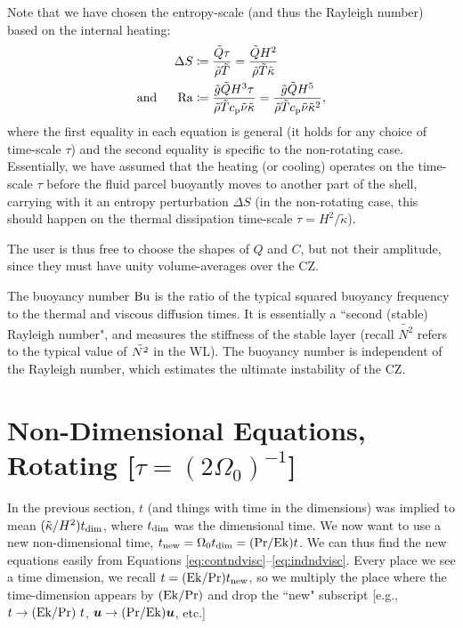 \documentclass[12pt]{article}
\numberwithin{equation}{section}
\begin{document}
Note that we have chosen the entropy-scale (and thus the Rayleigh number) based on the internal heating:
\begin{subequations}
\begin{align}
	\Delta S &\coloneqq \frac{\tilde{Q}\tau}{\tilde{\rho}\tilde{T}} = \frac{\tilde{Q}H^2}{\tilde{\rho}\tilde{T}\tilde{\kappa}}\label{eq:dsnonrot}\\
	\text{and}\ \ \ \ \  {\rm{Ra}} &\coloneqq \frac{\tilde{g} \tilde{Q} H^3\tau}{\tilde{\rho}\tilde{T}c_{\rm{p}}\tilde{\nu} \tilde{\kappa}} =  \frac{\tilde{g} \tilde{Q} H^5}{\tilde{\rho}\tilde{T}c_{\rm{p}}\tilde{\nu} \tilde{\kappa}^2},\label{eq:ranonrot}\\ 
\end{align}
\end{subequations}
where the first equality in each equation is general (it holds for any choice of time-scale $\tau$) and the second equality is specific to the non-rotating case. Essentially, we have assumed that the heating (or cooling) operates on the time-scale $\tau$ before the fluid parcel buoyantly moves to another part of the shell, carrying with it an entropy perturbation $\Delta S$ (in the non-rotating case, this should happen on the thermal dissipation time-scale $\tau=H^2/\tilde{\kappa}$). 

The user is thus free to choose the shapes of $Q$ and $C$, but not their amplitude, since they must have unity volume-averages over the CZ. 

The buoyancy number ${\rm{Bu}}$ is the ratio of the typical squared buoyancy frequency to the thermal and viscous diffusion times. It is essentially a ``second (stable) Rayleigh number", and measures the stiffness of the stable layer (recall $\widetilde{N^2}$ refers to the typical value of $\tilde{N^2}$ in the WL). The buoyancy number is independent of the Rayleigh number, which estimates the ultimate instability of the CZ. 

\section{Non-Dimensional Equations, Rotating [$\tau=(2\Omega_0)^{-1}$]}
In the previous section, $t$ (and things with time in the dimensions) was implied to mean $(\tilde{\kappa}/H^2) t_{\rm{dim}}$, where $t_{\rm{dim}}$ was the dimensional time. We now want to use a new non-dimensional time, $t_{\rm{new}}= \Omega_0t_{\rm{dim}} = ({\rm{Pr}}/{\rm{Ek}})t$. We can thus find the new equations easily from Equations \eqref{eq:contndvisc}--\eqref{eq:indndvisc}. Every place we see a time dimension, we recall $t=({\rm{Ek}} /{\rm{Pr}})t_{\rm{new}}$, so we multiply the place where the time-dimension appears by $({\rm{Ek}}/{\rm{Pr}})$ and drop the ``new" subscript [e.g., $t\rightarrow ({\rm{Ek}}/{\rm{Pr}})\ t$, $\bm{u}\rightarrow({\rm{Pr}}/{\rm{Ek}})\bm{u}$, etc.]  
\end{document}
